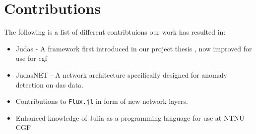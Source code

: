 \section{Contributions}

The following is a list of different contribtuions our work has resulted in: 

\begin{itemize}
    \item Judas - A framework first introduced in our project thesis \cite{projthesis}, now improved for use for \acrfull{cgf}
    \item JudasNET - A network architecture specifically designed for anomaly detection on \acrshort{das} data.
    \item Contributions to \texttt{Flux.jl} in form of new 
    network layers.
    \item Enhanced knowledge of Julia as a programming language for use at NTNU CGF
\end{itemize}